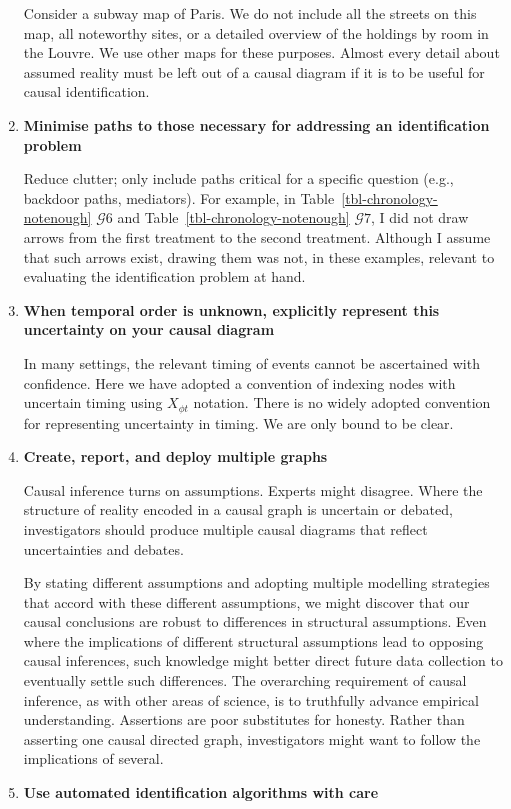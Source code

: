 \documentclass[
  single column]{article}
\begin{document}
\begin{enumerate}
  Consider a subway map of Paris. We do not include all the streets on
  this map, all noteworthy sites, or a detailed overview of the holdings
  by room in the Louvre. We use other maps for these purposes. Almost
  every detail about assumed reality must be left out of a causal
  diagram if it is to be useful for causal identification.
\item
  \textbf{Minimise paths to those necessary for addressing an
  identification problem}

  Reduce clutter; only include paths critical for a specific question
  (e.g., backdoor paths, mediators). For example, in
  Table~\ref{tbl-chronology-notenough} \(\mathcal{G} 6\) and
  Table~\ref{tbl-chronology-notenough} \(\mathcal{G} 7\), I did not draw
  arrows from the first treatment to the second treatment. Although I
  assume that such arrows exist, drawing them was not, in these
  examples, relevant to evaluating the identification problem at hand.
\item
  \textbf{When temporal order is unknown, explicitly represent this
  uncertainty on your causal diagram}

  In many settings, the relevant timing of events cannot be ascertained
  with confidence. Here we have adopted a convention of indexing nodes
  with uncertain timing using \(X_{\phi t}\) notation. There is no
  widely adopted convention for representing uncertainty in timing. We
  are only bound to be clear.
\item
  \textbf{Create, report, and deploy multiple graphs}

  Causal inference turns on assumptions. Experts might disagree. Where
  the structure of reality encoded in a causal graph is uncertain or
  debated, investigators should produce multiple causal diagrams that
  reflect uncertainties and debates.

  By stating different assumptions and adopting multiple modelling
  strategies that accord with these different assumptions, we might
  discover that our causal conclusions are robust to differences in
  structural assumptions. Even where the implications of different
  structural assumptions lead to opposing causal inferences, such
  knowledge might better direct future data collection to eventually
  settle such differences. The overarching requirement of causal
  inference, as with other areas of science, is to truthfully advance
  empirical understanding. Assertions are poor substitutes for honesty.
  Rather than asserting one causal directed graph, investigators might
  want to follow the implications of several.
\item
  \textbf{Use automated identification algorithms with care}


\end{enumerate}
\end{document}
